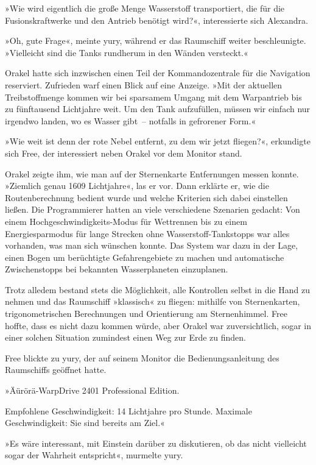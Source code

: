 

»Wie wird eigentlich die große Menge Wasserstoff transportiert, die für die Fusionskraftwerke und den Antrieb benötigt wird?«, interessierte sich Alexandra.

»Oh, gute Frage«, meinte yury, während er das Raumschiff weiter beschleunigte. »Vielleicht sind die Tanks rundherum in den Wänden versteckt.«

Orakel hatte sich inzwischen einen Teil der Kommandozentrale für die Navigation reserviert. Zufrieden warf einen Blick auf eine Anzeige. »Mit der aktuellen Treibstoffmenge kommen wir bei sparsamem Umgang mit dem Warpantrieb bis zu fünftausend Lichtjahre weit. Um den Tank aufzufüllen, müssen wir einfach nur irgendwo landen, wo es Wasser gibt~– notfalls in gefrorener Form.«

»Wie weit ist denn der rote Nebel entfernt, zu dem wir jetzt fliegen?«, erkundigte sich Free, der interessiert neben Orakel vor dem Monitor stand.

Orakel zeigte ihm, wie man auf der Sternenkarte Entfernungen messen konnte. »Ziemlich genau 1609 Lichtjahre«, las er vor. Dann erklärte er, wie die Routenberechnung bedient wurde und welche Kriterien sich dabei einstellen ließen. Die Programmierer hatten an viele verschiedene Szenarien gedacht: Von einem Hochgeschwindigkeits-Modus für Wettrennen bis zu einem Energiesparmodus für lange Strecken ohne Wasserstoff-Tankstopps war alles vorhanden, was man sich wünschen konnte. Das System war dazu in der Lage, einen Bogen um berüchtigte Gefahrengebiete zu machen und automatische Zwischenstopps bei bekannten Wasserplaneten einzuplanen.

Trotz alledem bestand stets die Möglichkeit, alle Kontrollen selbst in die Hand zu nehmen und das Raumschiff »klassisch« zu fliegen: mithilfe von Sternenkarten, trigonometrischen Berechnungen und Orientierung am Sternenhimmel. Free hoffte, dass es nicht dazu kommen würde, aber Orakel war zuversichtlich, sogar in einer solchen Situation zumindest einen Weg zur Erde zu finden.

Free blickte zu yury, der auf seinem Monitor die Bedienungsanleitung des Raumschiffs geöffnet hatte.

»Äürörä-WarpDrive 2401 Professional Edition.

Empfohlene Geschwindigkeit: 14 Lichtjahre pro Stunde.
Maximale Geschwindigkeit: Sie sind bereits am Ziel.«

»Es wäre interessant, mit Einstein darüber zu diskutieren, ob das nicht vielleicht sogar der Wahrheit entspricht«, murmelte yury.

